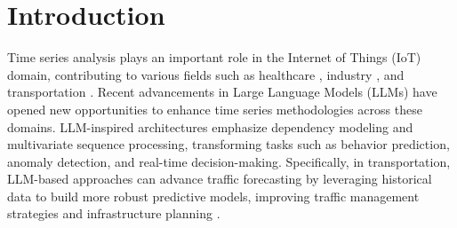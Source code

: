 \documentclass[acmsmall]{acmart}
\begin{document}



\maketitle

\section{Introduction}

 
 




Time series analysis plays an important role in the Internet of Things (IoT) domain, contributing to various fields such as healthcare \cite{garcia2025eeg,kumar2020time,ahmed2023multivariate}, industry \cite{raparthy35predictive,de2022deep,aseeri2023effective}, and transportation \cite{zeng2022modeling,xing2022estimating,chauhan2024confined}. Recent advancements in Large Language Models (LLMs) have opened new opportunities to enhance time series methodologies across these domains. LLM-inspired architectures emphasize dependency modeling and multivariate sequence processing, transforming tasks such as behavior prediction, anomaly detection, and real-time decision-making. Specifically, in transportation, LLM-based approaches can advance traffic forecasting by leveraging historical data to build more robust predictive models, improving traffic management strategies and infrastructure planning \cite{li2024traffic}.
\end{document}
